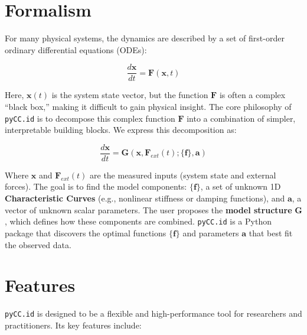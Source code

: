 \hypertarget{formalism}{%
\section{Formalism}\label{formalism}}

For many physical systems, the dynamics are described by a set of
first-order ordinary differential equations (ODEs):

\[
\frac{d\mathbf{x}}{dt} = \mathbf{F}(\mathbf{x}, t)
\]

Here, \(\mathbf{x}(t)\) is the system state vector, but the function
\(\mathbf{F}\) is often a complex ``black box,'' making it difficult to
gain physical insight. The core philosophy of \texttt{pyCC.id} is to
decompose this complex function \(\mathbf{F}\) into a combination of
simpler, interpretable building blocks. We express this decomposition
as:

\[
\frac{d\mathbf{x}}{dt} = \mathbf{G}(\mathbf{x}, \mathbf{F}_{ext}(t); \{\mathbf{f}\}, \mathbf{a})
\]

Where \(\mathbf{x}\) and \(\mathbf{F}_{ext}(t)\) are the measured inputs
(system state and external forces). The goal is to find the model
components: \(\{\mathbf{f}\}\), a set of unknown 1D
\textbf{Characteristic Curves} (e.g., nonlinear stiffness or damping
functions), and \(\mathbf{a}\), a vector of unknown scalar parameters.
The user proposes the \textbf{model structure} \(\mathbf{G}\), which
defines how these components are combined. \texttt{pyCC.id} is a Python
package that discovers the optimal functions \(\{\mathbf{f}\}\) and
parameters \(\mathbf{a}\) that best fit the observed data.

\hypertarget{features}{%
\section{Features}\label{features}}

\texttt{pyCC.id} is designed to be a flexible and high-performance tool
for researchers and practitioners. Its key features include:


